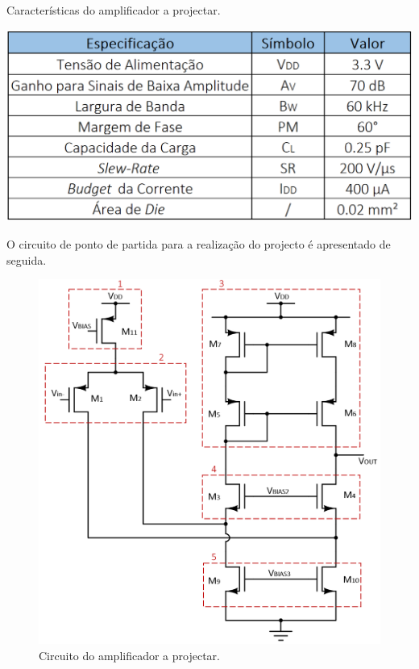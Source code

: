 \documentclass[11pt]{article}
\numberwithin{equation}{section}
\begin{document}
\begin{table}[H]
	\centering
	\caption{Características do amplificador a projectar.}
	\vspace{-1.5mm}
	\includegraphics[keepaspectratio=true, scale=0.45]{teoricas/tabela1}
\end{table}

O circuito de ponto de partida para a realização do projecto é apresentado de seguida.

\begin{figure}[H]
	\centering
	\includegraphics[keepaspectratio=true, scale=0.50]{teoricas/circuito1}
	\vspace{-0.5em}
	\caption{Circuito do amplificador a projectar.}
	\vspace{-0.8em}
\end{figure} 
\end{document}
